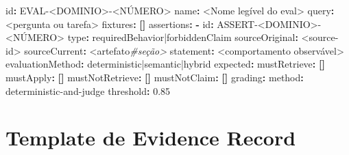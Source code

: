 \documentclass[
  10pt,
  a4paper,
  oneside]{book}
\newenvironment{Shaded}{}{}
\newcommand{\AttributeTok}[1]{\textcolor[rgb]{0.49,0.56,0.16}{#1}}
\newcommand{\CommentTok}[1]{\textcolor[rgb]{0.38,0.63,0.69}{\textit{#1}}}
\newcommand{\FloatTok}[1]{\textcolor[rgb]{0.25,0.63,0.44}{#1}}
\newcommand{\FunctionTok}[1]{\textcolor[rgb]{0.02,0.16,0.49}{#1}}
\newcommand{\KeywordTok}[1]{\textcolor[rgb]{0.00,0.44,0.13}{\textbf{#1}}}
\begin{document}
\begin{Shaded}
\begin{Highlighting}[]
\FunctionTok{id}\KeywordTok{:}\AttributeTok{ EVAL{-}\textless{}DOMINIO\textgreater{}{-}\textless{}NÚMERO\textgreater{}}
\FunctionTok{name}\KeywordTok{:}\AttributeTok{ \textless{}Nome legível do eval\textgreater{}}
\FunctionTok{query}\KeywordTok{:}\AttributeTok{ \textless{}pergunta ou tarefa\textgreater{}}
\FunctionTok{fixtures}\KeywordTok{:}\AttributeTok{ }\KeywordTok{[]}
\FunctionTok{assertions}\KeywordTok{:}
\AttributeTok{  }\KeywordTok{{-}}\AttributeTok{ }\FunctionTok{id}\KeywordTok{:}\AttributeTok{ ASSERT{-}\textless{}DOMINIO\textgreater{}{-}\textless{}NÚMERO\textgreater{}}
\AttributeTok{    }\FunctionTok{type}\KeywordTok{:}\AttributeTok{ requiredBehavior|forbiddenClaim}
\AttributeTok{    }\FunctionTok{sourceOriginal}\KeywordTok{:}\AttributeTok{ \textless{}source{-}id\textgreater{}}
\AttributeTok{    }\FunctionTok{sourceCurrent}\KeywordTok{:}\AttributeTok{ \textless{}artefato}\CommentTok{\#seção\textgreater{}}
\AttributeTok{    }\FunctionTok{statement}\KeywordTok{:}\AttributeTok{ \textless{}comportamento observável\textgreater{}}
\AttributeTok{    }\FunctionTok{evaluationMethod}\KeywordTok{:}\AttributeTok{ deterministic|semantic|hybrid}
\FunctionTok{expected}\KeywordTok{:}
\AttributeTok{  }\FunctionTok{mustRetrieve}\KeywordTok{:}\AttributeTok{ }\KeywordTok{[]}
\AttributeTok{  }\FunctionTok{mustApply}\KeywordTok{:}\AttributeTok{ }\KeywordTok{[]}
\AttributeTok{  }\FunctionTok{mustNotRetrieve}\KeywordTok{:}\AttributeTok{ }\KeywordTok{[]}
\AttributeTok{  }\FunctionTok{mustNotClaim}\KeywordTok{:}\AttributeTok{ }\KeywordTok{[]}
\FunctionTok{grading}\KeywordTok{:}
\AttributeTok{  }\FunctionTok{method}\KeywordTok{:}\AttributeTok{ deterministic{-}and{-}judge}
\AttributeTok{  }\FunctionTok{threshold}\KeywordTok{:}\AttributeTok{ }\FloatTok{0.85}
\end{Highlighting}
\end{Shaded}

\hypertarget{template-de-evidence-record}{%
\section{Template de Evidence
Record}\label{template-de-evidence-record}}
\end{document}
